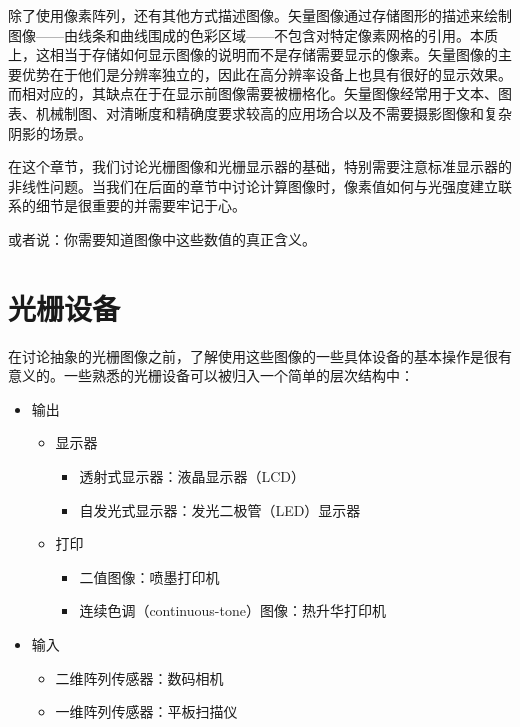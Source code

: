 \documentclass[lang=cn,12pt]{elegantbook}
\begin{document}
除了使用像素阵列，还有其他方式描述图像。矢量图像通过存储图形的描述来绘制图像——由线条和曲线围成的色彩区域——不包含对特定像素网格的引用。本质上，这相当于存储如何显示图像的说明而不是存储需要显示的像素。矢量图像的主要优势在于他们是分辨率独立的，因此在高分辨率设备上也具有很好的显示效果。而相对应的，其缺点在于在显示前图像需要被栅格化。矢量图像经常用于文本、图表、机械制图、对清晰度和精确度要求较高的应用场合以及不需要摄影图像和复杂阴影的场景。

在这个章节，我们讨论光栅图像和光栅显示器的基础，特别需要注意标准显示器的非线性问题。当我们在后面的章节中讨论计算图像时，像素值如何与光强度建立联系的细节是很重要的并需要牢记于心。

\begin{note}
  或者说：你需要知道图像中这些数值的真正含义。
\end{note}

\section{光栅设备}

在讨论抽象的光栅图像之前，了解使用这些图像的一些具体设备的基本操作是很有意义的。一些熟悉的光栅设备可以被归入一个简单的层次结构中：

\begin{itemize}
  \item 输出
        \begin{itemize}
          \item 显示器
                \begin{itemize}
                  \item 透射式显示器：液晶显示器（LCD）
                  \item 自发光式显示器：发光二极管（LED）显示器
                \end{itemize}
          \item 打印
                \begin{itemize}
                  \item 二值图像：喷墨打印机
                  \item 连续色调（continuous-tone）图像：热升华打印机
                \end{itemize}
        \end{itemize}
  \item 输入
        \begin{itemize}
          \item 二维阵列传感器：数码相机
          \item 一维阵列传感器：平板扫描仪
        \end{itemize}
\end{itemize}
\end{document}
